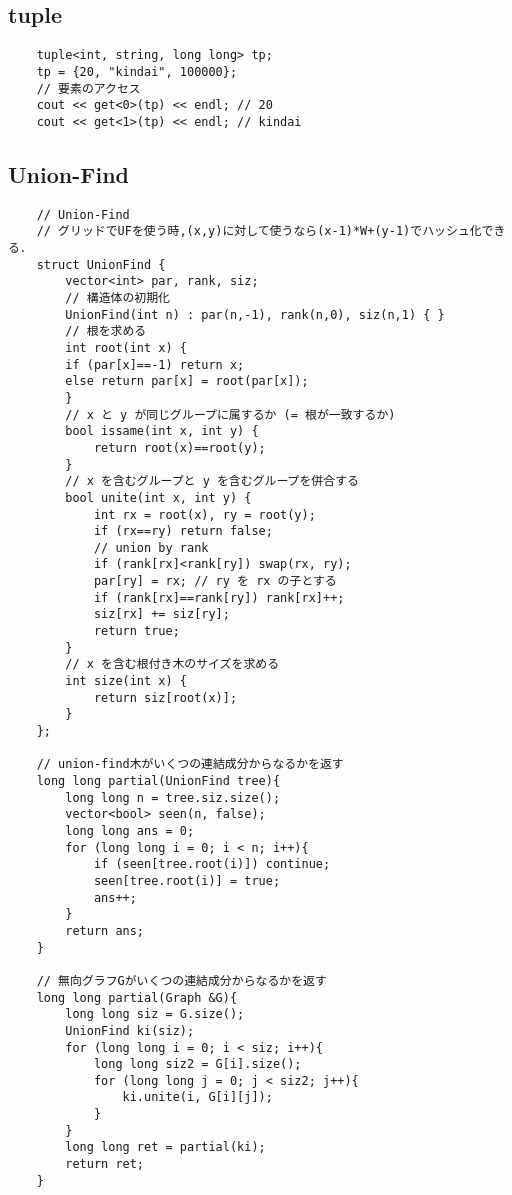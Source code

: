 \documentclass[a4paper, landscape, 9pt]{jarticle} %
\begin{document}
\begin{multicols*}{3}
    \subsection{tuple}
    \begin{lstlisting}
    tuple<int, string, long long> tp;
    tp = {20, "kindai", 100000};
    // 要素のアクセス
    cout << get<0>(tp) << endl; // 20
    cout << get<1>(tp) << endl; // kindai
    \end{lstlisting}

    \subsection{Union-Find}
    \begin{lstlisting}
    // Union-Find
    // グリッドでUFを使う時,(x,y)に対して使うなら(x-1)*W+(y-1)でハッシュ化できる．
    struct UnionFind {
        vector<int> par, rank, siz;
        // 構造体の初期化
        UnionFind(int n) : par(n,-1), rank(n,0), siz(n,1) { }
        // 根を求める
        int root(int x) {
        if (par[x]==-1) return x;
        else return par[x] = root(par[x]);
        }
        // x と y が同じグループに属するか (= 根が一致するか)
        bool issame(int x, int y) {
            return root(x)==root(y);
        }
        // x を含むグループと y を含むグループを併合する
        bool unite(int x, int y) {
            int rx = root(x), ry = root(y);
            if (rx==ry) return false;
            // union by rank
            if (rank[rx]<rank[ry]) swap(rx, ry);
            par[ry] = rx; // ry を rx の子とする
            if (rank[rx]==rank[ry]) rank[rx]++;
            siz[rx] += siz[ry];
            return true;
        }
        // x を含む根付き木のサイズを求める
        int size(int x) {
            return siz[root(x)];
        }
    };
    
    // union-find木がいくつの連結成分からなるかを返す
    long long partial(UnionFind tree){
        long long n = tree.siz.size();
        vector<bool> seen(n, false);
        long long ans = 0;
        for (long long i = 0; i < n; i++){
            if (seen[tree.root(i)]) continue;
            seen[tree.root(i)] = true;
            ans++;
        }
        return ans;
    }
    
    // 無向グラフGがいくつの連結成分からなるかを返す
    long long partial(Graph &G){
        long long siz = G.size();
        UnionFind ki(siz);
        for (long long i = 0; i < siz; i++){
            long long siz2 = G[i].size();
            for (long long j = 0; j < siz2; j++){
                ki.unite(i, G[i][j]);
            }
        }
        long long ret = partial(ki);
        return ret;
    }
    \end{lstlisting}


\end{multicols*}
\end{document}
